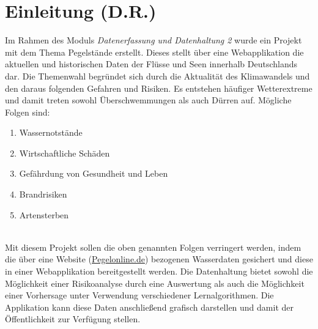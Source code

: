 \section{Einleitung (D.R.)}
Im Rahmen des Moduls \textit{Datenerfassung und Datenhaltung 2} wurde ein Projekt mit dem Thema Pegelstände erstellt.
Dieses stellt über eine Webapplikation die aktuellen und historischen Daten der Flüsse und Seen innerhalb Deutschlands dar.
Die Themenwahl begründet sich durch die Aktualität des Klimawandels und den daraus folgenden Gefahren und Risiken. 
Es entstehen häufiger Wetterextreme und damit treten sowohl Überschwemmungen als auch Dürren auf. Mögliche Folgen sind:

\begin{enumerate}
    \item Wassernotstände
    \item Wirtschaftliche Schäden
    \item Gefährdung von Gesundheit und Leben
    \item Brandrisiken
    \item Artensterben
\end{enumerate}~\\
Mit diesem Projekt sollen die oben genannten Folgen verringert werden, indem die über eine Website (\href{https://www.pegelonline.wsv.de/gast/start}{Pegelonline.de}) bezogenen Wasserdaten gesichert und diese in einer Webapplikation bereitgestellt werden. 
Die Datenhaltung bietet sowohl die Möglichkeit einer Risikoanalyse durch eine Auswertung als auch die Möglichkeit einer Vorhersage unter Verwendung verschiedener Lernalgorithmen. 
Die Applikation kann diese Daten anschließend grafisch darstellen und damit der Öffentlichkeit zur Verfügung stellen.



